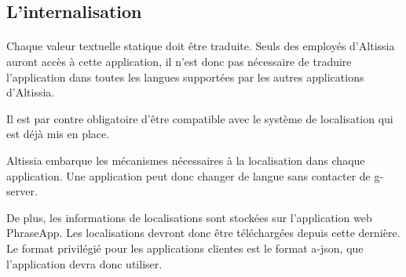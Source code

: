 \subsection{L'internalisation}
\label{subsec:i18n}

\paragraph{}
Chaque valeur textuelle statique\fnmark{} doit être traduite. Seuls des employés d'Altissia auront accès à cette application, il n'est donc pas nécessaire de traduire l'application dans toutes les langues supportées par les autres applications d'Altissia\fnmark{}.

Il est par contre obligatoire d'être compatible avec le système de localisation qui est déjà mis en place.

Altissia embarque les mécanismes nécessaires à la localisation dans chaque application. Une application peut donc changer de langue sans contacter de \gls{g-server}.

De plus, les informations de localisations sont stockées sur l'application web PhraseApp.
Les localisations devront donc être téléchargées depuis cette dernière.
Le format privilégié pour les applications clientes est le format \gls{a-json}, que l'application devra donc utiliser.
